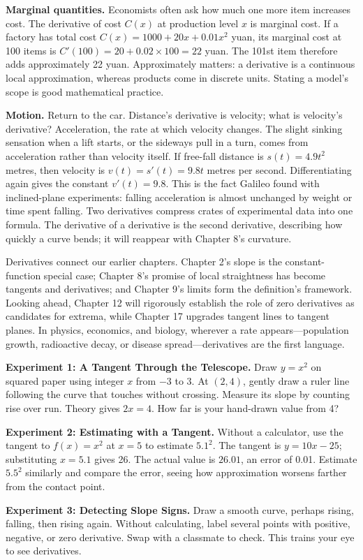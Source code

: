 \textbf{Marginal quantities.} Economists often ask how much one more item increases cost. The derivative of cost $C(x)$ at production level $x$ is marginal cost. If a factory has total cost $C(x)=1000+20x+0.01x^2$ yuan, its marginal cost at 100 items is $C'(100)=20+0.02\times 100=22$ yuan. The 101st item therefore adds approximately 22 yuan. Approximately matters: a derivative is a continuous local approximation, whereas products come in discrete units. Stating a model's scope is good mathematical practice.

\textbf{Motion.} Return to the car. Distance's derivative is velocity; what is velocity's derivative? Acceleration, the rate at which velocity changes. The slight sinking sensation when a lift starts, or the sideways pull in a turn, comes from acceleration rather than velocity itself. If free-fall distance is $s(t)=4.9t^2$ metres, then velocity is $v(t)=s'(t)=9.8t$ metres per second. Differentiating again gives the constant $v'(t)=9.8$. This is the fact Galileo found with inclined-plane experiments: falling acceleration is almost unchanged by weight or time spent falling. Two derivatives compress crates of experimental data into one formula. The derivative of a derivative is the second derivative, describing how quickly a curve bends; it will reappear with Chapter 8's curvature.

\begin{lianjie}
Derivatives connect our earlier chapters. Chapter 2's slope is the constant-function special case; Chapter 8's promise of local straightness has become tangents and derivatives; and Chapter 9's limits form the definition's framework. Looking ahead, Chapter 12 will rigorously establish the role of zero derivatives as candidates for extrema, while Chapter 17 upgrades tangent lines to tangent planes. In physics, economics, and biology, wherever a rate appears---population growth, radioactive decay, or disease spread---derivatives are the first language.
\end{lianjie}

\begin{shiyan}
\textbf{Experiment 1: A Tangent Through the Telescope.} Draw $y=x^2$ on squared paper using integer $x$ from $-3$ to $3$. At $(2,4)$, gently draw a ruler line following the curve that touches without crossing. Measure its slope by counting rise over run. Theory gives $2x=4$. How far is your hand-drawn value from 4?

\textbf{Experiment 2: Estimating with a Tangent.} Without a calculator, use the tangent to $f(x)=x^2$ at $x=5$ to estimate $5.1^2$. The tangent is $y=10x-25$; substituting $x=5.1$ gives 26. The actual value is $26.01$, an error of 0.01. Estimate $5.5^2$ similarly and compare the error, seeing how approximation worsens farther from the contact point.

\textbf{Experiment 3: Detecting Slope Signs.} Draw a smooth curve, perhaps rising, falling, then rising again. Without calculating, label several points with positive, negative, or zero derivative. Swap with a classmate to check. This trains your eye to see derivatives.
\end{shiyan}

